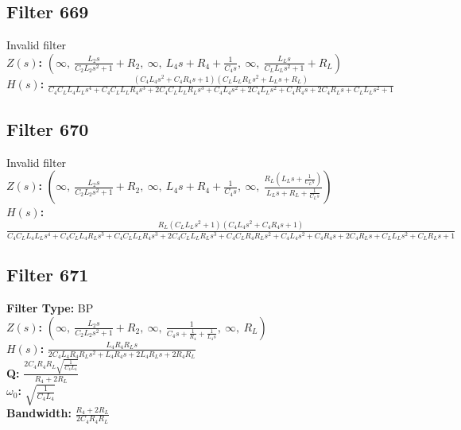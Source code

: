 \documentclass{article}
\begin{document}
\subsection*{Filter 669}
Invalid filter \\ 
\textbf{$Z(s)$:} $\left( \infty, \  \frac{L_{2} s}{C_{2} L_{2} s^{2} + 1} + R_{2}, \  \infty, \  L_{4} s + R_{4} + \frac{1}{C_{4} s}, \  \infty, \  \frac{L_{L} s}{C_{L} L_{L} s^{2} + 1} + R_{L}\right)$ \\ 
\textbf{$H(s)$:} $\frac{\left(C_{4} L_{4} s^{2} + C_{4} R_{4} s + 1\right) \left(C_{L} L_{L} R_{L} s^{2} + L_{L} s + R_{L}\right)}{C_{4} C_{L} L_{4} L_{L} s^{4} + C_{4} C_{L} L_{L} R_{4} s^{3} + 2 C_{4} C_{L} L_{L} R_{L} s^{3} + C_{4} L_{4} s^{2} + 2 C_{4} L_{L} s^{2} + C_{4} R_{4} s + 2 C_{4} R_{L} s + C_{L} L_{L} s^{2} + 1}$ \\ 
\subsection*{Filter 670}
Invalid filter \\ 
\textbf{$Z(s)$:} $\left( \infty, \  \frac{L_{2} s}{C_{2} L_{2} s^{2} + 1} + R_{2}, \  \infty, \  L_{4} s + R_{4} + \frac{1}{C_{4} s}, \  \infty, \  \frac{R_{L} \left(L_{L} s + \frac{1}{C_{L} s}\right)}{L_{L} s + R_{L} + \frac{1}{C_{L} s}}\right)$ \\ 
\textbf{$H(s)$:} $\frac{R_{L} \left(C_{L} L_{L} s^{2} + 1\right) \left(C_{4} L_{4} s^{2} + C_{4} R_{4} s + 1\right)}{C_{4} C_{L} L_{4} L_{L} s^{4} + C_{4} C_{L} L_{4} R_{L} s^{3} + C_{4} C_{L} L_{L} R_{4} s^{3} + 2 C_{4} C_{L} L_{L} R_{L} s^{3} + C_{4} C_{L} R_{4} R_{L} s^{2} + C_{4} L_{4} s^{2} + C_{4} R_{4} s + 2 C_{4} R_{L} s + C_{L} L_{L} s^{2} + C_{L} R_{L} s + 1}$ \\ 
\subsection*{Filter 671}
\textbf{Filter Type:} BP \\ 
\textbf{$Z(s)$:} $\left( \infty, \  \frac{L_{2} s}{C_{2} L_{2} s^{2} + 1} + R_{2}, \  \infty, \  \frac{1}{C_{4} s + \frac{1}{R_{4}} + \frac{1}{L_{4} s}}, \  \infty, \  R_{L}\right)$ \\ 
\textbf{$H(s)$:} $\frac{L_{4} R_{4} R_{L} s}{2 C_{4} L_{4} R_{4} R_{L} s^{2} + L_{4} R_{4} s + 2 L_{4} R_{L} s + 2 R_{4} R_{L}}$ \\ 
\textbf{Q:} $\frac{2 C_{4} R_{4} R_{L} \sqrt{\frac{1}{C_{4} L_{4}}}}{R_{4} + 2 R_{L}}$ \\ 
\textbf{$\omega_0$:} $\sqrt{\frac{1}{C_{4} L_{4}}}$ \\ 
\textbf{Bandwidth:} $\frac{R_{4} + 2 R_{L}}{2 C_{4} R_{4} R_{L}}$ \\ 
\end{document}
